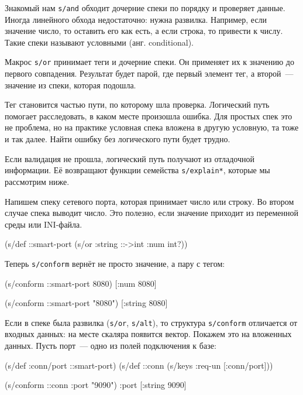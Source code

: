 Знакомый нам \verb|s/and| обходит дочерние спеки по порядку и проверяет
данные. Иногда линейного обхода недостаточно: нужна развилка. Например, если
значение число, то оставить его как есть, а если строка, то привести к
числу. Такие спеки называют условными (анг. conditional).

Макрос \verb|s/or| принимает теги и дочерние спеки. Он применяет их к значению
до первого совпадения. Результат будет парой, где первый элемент тег, а
второй~--- значение из спеки, которая подошла.

Тег становится частью пути, по которому шла проверка. Логический путь помогает
расследовать, в каком месте произошла ошибка. Для простых спек это не проблема,
но на практике условная спека вложена в другую условную, та тоже и так
далее. Найти ошибку без логического пути будет трудно.


Если валидация не прошла, логический путь получают из отладочной информации. Её
возвращают функции семейства \verb|s/explain*|, которые мы рассмотрим ниже.

Напишем спеку сетевого порта, которая принимает число или строку. Во втором
случае спека выводит число. Это полезно, если значение приходит из переменной
среды или INI-файла.

\begin{english}
  \begin{clojure}
(s/def ::smart-port
  (s/or :string ::->int :num int?))
  \end{clojure}
\end{english}

\noindent
Теперь \verb|s/conform| вернёт не просто значение, а пару с тегом:

\begin{english}
  \begin{clojure}
(s/conform ::smart-port 8080)
[:num 8080]

(s/conform ::smart-port "8080")
[:string 8080]
  \end{clojure}
\end{english}


Если в спеке была развилка (\verb|s/or|, \verb|s/alt|), то структура
\verb|s/conform| отличается от входных данных: на месте скаляра появится
вектор. Покажем это на вложенных данных. Пусть порт~--- одно из полей
подключения к базе:

\begin{english}
  \begin{clojure}
(s/def :conn/port ::smart-port)
(s/def ::conn
  (s/keys :req-un [:conn/port]))

(s/conform ::conn {:port "9090"})
{:port [:string 9090]}
  \end{clojure}
\end{english}

